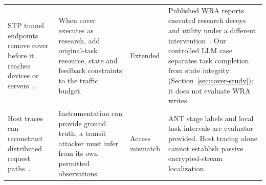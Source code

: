 \begin{table}[t]
\begin{tabularx}{\textwidth}{@{}P{.25\textwidth}P{.29\textwidth}P{.10\textwidth}Y@{}}
STP tunnel endpoints remove cover before it reaches devices or servers~\cite[Sec.~7.1]{apthorpe2019stp}. & When cover executes as research, add original-task resource, state and feedback constraints to the traffic budget. & Extended & Published WRA reports executed research decoys and utility under a different intervention~\cite{jeong2026wra}. Our controlled LLM case separates task completion from state integrity (Section~\ref{sec:cover-study}); it does not evaluate WRA writes. \\\addlinespace[3pt]
Host traces can reconstruct distributed request paths~\cite{reynolds2006wap5,tak2009vpath}. & Instrumentation can provide ground truth; a transit attacker must infer from its own permitted observations. & Access mismatch & ANT stage labels and local task intervals are evaluator-provided. Host tracing alone cannot establish passive encrypted-stream localization. \\\bottomrule
\end{tabularx}
\end{table}
